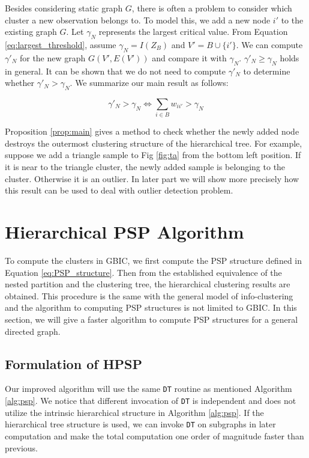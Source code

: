 Besides considering static graph $G$, there is often a problem to consider which cluster a new observation belongs to.
To model this, we add a new node $i'$ to the existing graph $G$. Let $\gamma_N$ represents the largest critical value.
From Equation \eqref{eq:largest_threshold}, assume $\gamma_N = I(Z_B)$ and $V'=B \cup \{i'\}$. We can compute $\gamma'_N$ for the new graph $G(V', E(V'))$ and compare it with $\gamma_N$. $\gamma'_N \geq \gamma_N$ holds in general. It can be shown that we do not need to compute $\gamma'_N$ to determine whether $\gamma'_N>\gamma_N$. We summarize our main result as follows:
\begin{proposition}\label{prop:main}
\begin{equation}
\gamma'_N > \gamma_N \iff  \sum_{i \in B} w_{ii'} > \gamma_N 
\end{equation}
\end{proposition}
Proposition \ref{prop:main} gives a method to check whether the newly added node destroys the outermost clustering structure of the hierarchical tree.  For example, suppose we add a triangle sample to Fig \ref{fig:ta} from the bottom left position. If it is near to the triangle cluster, the newly added sample is belonging to the cluster. Otherwise it is an outlier. In later part we will show more precisely how this result can be used to deal with outlier detection problem.

\section{Hierarchical PSP Algorithm}\label{sec:alg}
To compute the clusters in GBIC, we first compute the PSP structure defined in Equation \eqref{eq:PSP_structure}. Then from the established equivalence of the nested partition and the clustering tree, the hierarchical
clustering results are obtained. This procedure is the same with the general model of info-clustering and the algorithm to computing PSP structures is not limited to GBIC. In this section, we will give a faster algorithm to compute PSP structures for a general directed graph.

\subsection{Formulation of HPSP}
Our improved algorithm will use the same \texttt{DT} routine as mentioned Algorithm \ref{alg:psp}. We notice that different invocation of \texttt{DT} is independent and does not utilize the intrinsic hierarchical structure in Algorithm \ref{alg:psp}. If the hierarchical tree structure is used, we can invoke \texttt{DT} on subgraphs in later computation and make the total computation one order of magnitude faster than previous.

